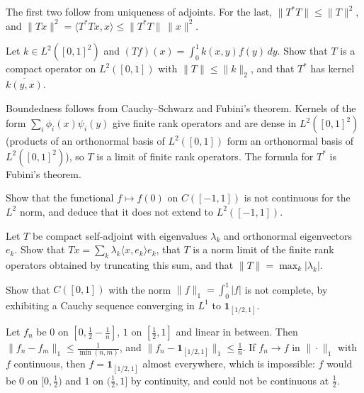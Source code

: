 \begin{solution}
The first two follow from uniqueness of adjoints. For the last, $\|T^*T\| \leq \|T\|^2$, and $\|Tx\|^2 = \langle T^*Tx, x \rangle \leq \|T^*T\|\,\|x\|^2$.
\end{solution}

\begin{exercise}\label{functional-analysis:exercise-integral-operator}
Let $k \in L^2([0,1]^2)$ and $(Tf)(x) = \int_0^1k(x, y)f(y)\,dy$. Show that $T$ is a compact operator on $L^2([0,1])$ with $\|T\| \leq \|k\|_2$, and that $T^*$ has kernel $\overline{k(y, x)}$.
\end{exercise}

\begin{solution}
Boundedness follows from Cauchy--Schwarz and Fubini's theorem. Kernels of the form $\sum_i\phi_i(x)\psi_i(y)$ give finite rank operators and are dense in $L^2([0,1]^2)$ (products of an orthonormal basis of
$L^2([0,1])$ form an orthonormal basis of $L^2([0,1]^2)$), so $T$ is a limit of finite rank operators. The formula for $T^*$ is Fubini's theorem.
\end{solution}

\begin{exercise}\label{functional-analysis:exercise-no-hahn-banach-norm}
Show that the functional $f \mapsto f(0)$ on $C([-1,1])$ is not continuous for the $L^2$ norm, and deduce that it does not extend to $L^2([-1,1])$.
\end{exercise}

\begin{exercise}\label{functional-analysis:exercise-spectral-projections}
Let $T$ be compact self-adjoint with eigenvalues $\lambda_k$ and orthonormal eigenvectors $e_k$. Show that $Tx = \sum_k\lambda_k\langle x, e_k \rangle e_k$, that $T$ is a norm limit of the finite rank operators
obtained by truncating this sum, and that $\|T\| = \max_k|\lambda_k|$.
\end{exercise}

\begin{exercise}\label{functional-analysis:exercise-l1-incomplete}
Show that $C([0, 1])$ with the norm $\|f\|_1 = \int_0^1|f|$ is not complete, by exhibiting a Cauchy sequence converging in $L^1$ to $\mathbf{1}_{[1/2, 1]}$.
\end{exercise}

\begin{solution}
Let $f_n$ be $0$ on $[0, \frac12 - \frac1n]$, $1$ on $[\frac12, 1]$ and linear in between. Then $\|f_n - f_m\|_1 \leq \frac1{\min(n, m)}$, and $\|f_n - \mathbf{1}_{[1/2, 1]}\|_1 \leq \frac1n$. If $f_n \to f$ in
$\|\cdot\|_1$ with $f$ continuous, then $f = \mathbf{1}_{[1/2, 1]}$ almost everywhere, which is impossible: $f$ would be $0$ on $[0, \frac12)$ and $1$ on $(\frac12, 1]$ by continuity, and could not be
continuous at $\frac12$.
\end{solution}

